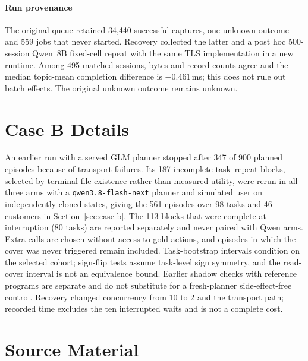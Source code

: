 

\paragraph{Run provenance}
The original queue retained 34,440 successful captures, one unknown outcome and 559 jobs that never started. Recovery collected the latter and a post hoc 500-session Qwen~8B fixed-cell repeat with the same TLS implementation in a new runtime. Among 495 matched sessions, bytes and record counts agree and the median topic-mean completion difference is $-0.461$\,ms; this does not rule out batch effects. The original unknown outcome remains unknown.

\section{Case B Details}\label{app:case-b}
An earlier run with a served GLM planner stopped after 347 of 900 planned episodes because of transport failures. Its 187 incomplete task--repeat blocks, selected by terminal-file existence rather than measured utility, were rerun in all three arms with a \texttt{qwen3.8-flash-next} planner and simulated user on independently cloned states, giving the 561 episodes over 98 tasks and 46 customers in Section~\ref{sec:case-b}. The 113 blocks that were complete at interruption (80 tasks) are reported separately and never paired with Qwen arms. Extra calls are chosen without access to gold actions, and episodes in which the cover was never triggered remain included. Task-bootstrap intervals condition on the selected cohort; sign-flip tests assume task-level sign symmetry, and the read-cover interval is not an equivalence bound. Earlier shadow checks with reference programs are separate and do not substitute for a fresh-planner side-effect-free control. Recovery changed concurrency from 10 to 2 and the transport path; recorded time excludes the ten interrupted waits and is not a complete cost.

\section{Source Material}\label{app:sources}
